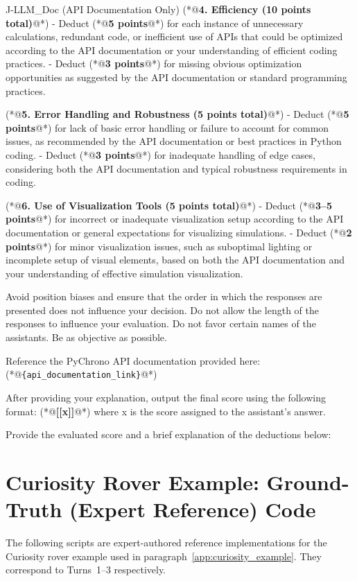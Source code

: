 \begin{PromptBlock}{J-LLM\_Doc (API Documentation Only)}
(*@\textbf{4. Efficiency (10 points total)}@*)
- Deduct (*@\textbf{5 points}@*) for each instance of unnecessary calculations, redundant code, or inefficient use of APIs that could be optimized according to the API documentation or your understanding of efficient coding practices.
- Deduct (*@\textbf{3 points}@*) for missing obvious optimization opportunities as suggested by the API documentation or standard programming practices.

(*@\textbf{5. Error Handling and Robustness (5 points total)}@*)
- Deduct (*@\textbf{5 points}@*) for lack of basic error handling or failure to account for common issues, as recommended by the API documentation or best practices in Python coding.
- Deduct (*@\textbf{3 points}@*) for inadequate handling of edge cases, considering both the API documentation and typical robustness requirements in coding.

(*@\textbf{6. Use of Visualization Tools (5 points total)}@*)
- Deduct (*@\textbf{3--5 points}@*) for incorrect or inadequate visualization setup according to the API documentation or general expectations for visualizing simulations.
- Deduct (*@\textbf{2 points}@*) for minor visualization issues, such as suboptimal lighting or incomplete setup of visual elements, based on both the API documentation and your understanding of effective simulation visualization.

Avoid position biases and ensure that the order in which the responses are presented does not influence your decision. Do not allow the length of the responses to influence your evaluation. Do not favor certain names of the assistants. Be as objective as possible.

Reference the PyChrono API documentation provided here: (*@\texttt{\{api\_documentation\_link\}}@*)

After providing your explanation, output the final score using the following format: (*@\textbf{[[x]]}@*) where x is the score assigned to the assistant's answer.

Provide the evaluated score and a brief explanation of the deductions below:
\end{PromptBlock}


\section{Curiosity Rover Example: Ground-Truth (Expert Reference) Code}
\label{app:curiosity_gt}

\noindent The following scripts are expert-authored reference implementations for the Curiosity rover example used in paragraph~\ref{app:curiosity_example}. They correspond to Turns~1--3 respectively.


